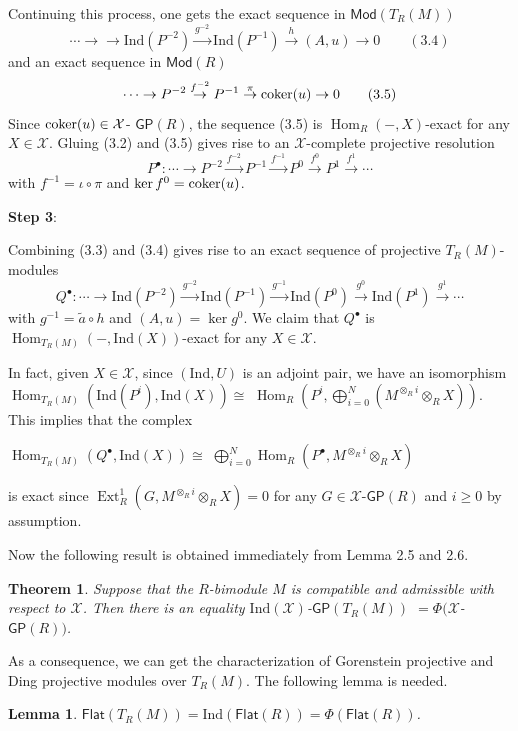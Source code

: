 \documentclass[10pt,twoside]{amsart}
\theoremstyle{bfupright head,slanted body}
\theoremstyle{bfupright head,upright body}
\theoremstyle{fixed bf head,slanted body}
\newtheorem{thm}[res]{Theorem}          \newtheorem*{thm*}{Theorem}
\newtheorem{lem}[res]{Lemma}            \newtheorem*{lem*}{Lemma}
\theoremstyle{fixed bf head,upright body}
\theoremstyle{numbered paragraph}
\newenvironment{prf*}[1][Proof]{%
  \begin{proof}[\bf #1]
    \setcounter{equation}{0}
    \renewcommand{\theequation}{\arabic{equation}}}
  {\end{proof}
}
\numberwithin{equation}{res}
\newcommand{\GP}{\mathsf{GP}}
\newcommand{\Flat}{\mathsf{Flat}}
\newcommand{\Mod}{\mathsf{Mod}}
\newcommand{\Ind}{\mathrm{Ind}}
\newcommand{\cok}{\mbox{\rm coker}}
\newcommand{\Hom}{\operatorname{Hom}}
\newcommand{\Ext}{\operatorname{Ext}}
\begin{document}
\begin{prf*}
Continuing this process, one gets the exact sequence in $\Mod(T_R(M))$
$$\cdots \to \rightarrow \Ind(P^{-2})\overset{g^{-2}}\to\Ind(P^{-1})  \overset{h}\to  (A, u)\to 0 \qquad (3.4)$$
and an exact sequence in $\Mod(R)$ $$\cdots\to P^{-2}\overset{f^{-2}} \to P^{-1} \overset{\pi}\to \cok(u) \to 0 \qquad (3.5)$$ 
Since $\cok(u) \in\mathcal{X}$- $ \GP(R)$, the sequence (3.5) is $\Hom_{R}(-, X)$-exact for any $X\in\mathcal{X}$.
Gluing (3.2) and (3.5) gives rise to an $\mathcal{X}$-complete projective resolution 
$$P^{\bullet}: \cdots\to P^{-2}\overset{f^{-2}}\to P^{-1}\overset{f^{-1}}\to P^{0} \overset{f^{0}}\to P^{1} \overset{f^{1}}\to \cdots$$
with $f^{-1}= \iota\circ\pi$ and $\ker f^{0} =\cok (u)$.

\textbf{Step 3}:

Combining (3.3) and (3.4) gives rise to an exact sequence of projective $T_R(M)$-modules
$$Q^{\bullet}: \cdots\to\Ind(P^{-2})\overset{g^{-2}}\to \Ind(P^{-1})\overset{g^{-1}}\to \Ind(P^{0})\overset{g^{0}}\to \Ind(P^{1})\overset{g^{1}}\to \cdots$$
with $g^{-1}= \widetilde{a}\circ h$ and $(A, u) = \ker g^{0}$. 
We claim that $Q^{\bullet}$ is $\Hom_{T_R(M)}(-, \Ind(X))$-exact for any $X\in\mathcal{X}$.

In fact, given $X\in\mathcal{X}$, 
since $(\Ind, U)$ is an adjoint pair, we have an isomorphism
$\Hom_{T_R(M)}(\Ind (P^{i}), \Ind(X))\cong$ 
$\Hom_{R}(P^{i}, \bigoplus_{i=0}^N(M^{\otimes_Ri}\otimes_R X))$. 
This implies that the complex 
\begin{center}
$\Hom_{T_R(M)}(Q^{\bullet}, \Ind(X))\cong$ 
$\bigoplus_{i=0}^N\Hom_{R}(P^{\bullet}, M^{\otimes_Ri}\otimes_R X)$
\end{center}
is exact since $\Ext_{R}^{1}(G, M^{\otimes_Ri}\otimes_R X) =0$ 
for any $G\in\mathcal{X}$-$\GP(R)$ and $i\geqslant 0$ by assumption.
\end{prf*}

Now the following result is obtained immediately from Lemma 2.5 and 2.6.

\begin{thm}\label{THM GP com}
Suppose that the $R$-bimodule $M$ is compatible and admissible with respect to $\mathcal{X}$.
Then there is an equality
$\Ind(\mathcal{X})$-$\GP(T_R(M))$ $= \Phi(\mathcal{X}$-$\GP(R))$.
\end{thm}

As a consequence, we can get the characterization of Gorenstein projective and Ding projective modules over $T_R(M)$.
The following lemma is needed.

\begin{lem} \label{homological modules}
 $\Flat(T_R(M))=\Ind(\Flat(R))=\Phi(\Flat(R))$.
\end{lem}
\end{document}
